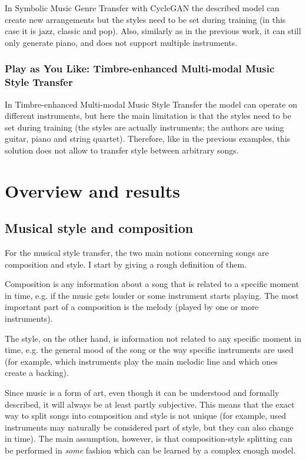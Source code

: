 \documentclass[en]{pracamgr}
\begin{document}
In Symbolic Music Genre Transfer with CycleGAN \cite{cyclegan} the described model can create new arrangements but the styles need to be set during training (in this case it is jazz, classic and pop).
Also, similarly as in the previous work, it can still only generate piano, and does not support multiple instruments.

\subsection{Play as You Like: Timbre-enhanced Multi-modal Music Style Transfer}

In Timbre-enhanced Multi-modal Music Style Transfer \cite{multimodal} the model can operate on different instruments, but here the main limitation is that the styles need to be set during training (the styles are actually instruments; the authors are using guitar, piano and string quartet).
Therefore, like in the previous examples, this solution does not allow to transfer style between arbitrary songs.

\chapter{Overview and results}

\section{Musical style and composition}

For the musical style transfer, the two main notions concerning songs are composition and style.
I start by giving a rough definition of them.

Composition is any information about a song that is related to a specific moment in time, e.g. if the music gets louder or some instrument starts playing.
The most important part of a composition is the melody (played by one or more instruments).

The style, on the other hand, is information not related to any specific moment in time, e.g. the general mood of the song or the way specific instruments are used (for example, which instruments play the main melodic line and which ones create a backing).

Since music is a form of art, even though it can be understood and formally described, it will always be at least partly subjective.
This means that the exact way to split songs into composition and style is not unique (for example, used instruments may naturally be considered part of style, but they can also change in time).
The main assumption, however, is that composition-style splitting can be performed in \emph{some} fashion which can be learned by a complex enough model.
\end{document}
